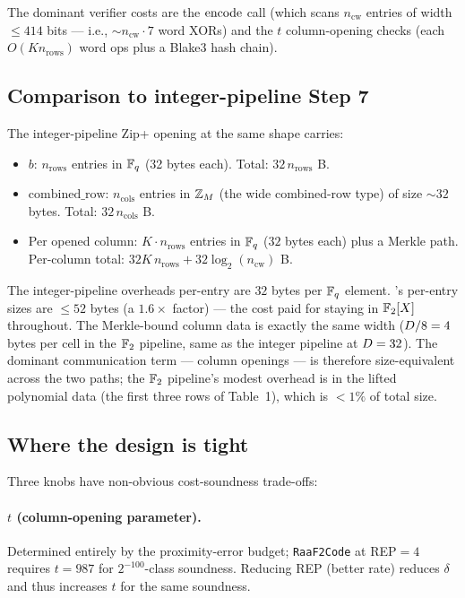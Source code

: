 The dominant verifier costs are the $\operatorname{encode}$ call (which scans
$n_{\mathrm{cw}}$ entries of width $\le 414$ bits — i.e., $\sim
n_{\mathrm{cw}} \cdot 7$ word XORs) and the $t$ column-opening checks
(each $O(K n_{\mathrm{rows}})$ word ops plus a Blake3 hash chain).

\subsection{Comparison to integer-pipeline Step 7}

The integer-pipeline Zip+ opening at the same shape carries:
\begin{itemize}[leftmargin=2em]
  \item $b$: $n_{\mathrm{rows}}$ entries in $\mathbb{F}_q$ (32 bytes each).
    Total: $32 \, n_{\mathrm{rows}}$ B.
  \item $\mathrm{combined\_row}$: $n_{\mathrm{cols}}$ entries in
    $\mathbb{Z}_M$ (the wide combined-row type) of size $\sim 32$ bytes.
    Total: $32 \, n_{\mathrm{cols}}$ B.
  \item Per opened column: $K \cdot n_{\mathrm{rows}}$ entries in
    $\mathbb{F}_q$ ($32$ bytes each) plus a Merkle path. Per-column total:
    $32 K \, n_{\mathrm{rows}} + 32 \log_2(n_{\mathrm{cw}})$ B.
\end{itemize}

The integer-pipeline overheads per-entry are $32$ bytes per $\mathbb{F}_q$
element. 's per-entry sizes are $\le 52$ bytes (a
$1.6\times$ factor) — the cost paid for staying in $\mathbb{F}_2[X]$
throughout. The Merkle-bound column data is exactly the same width
($D/8 = 4$ bytes per cell in the $\mathbb{F}_2$ pipeline, same as the
integer pipeline at $D = 32$). The dominant communication term —
column openings — is therefore size-equivalent across the two paths;
the $\mathbb{F}_2$ pipeline's modest overhead is in the lifted polynomial
data (the first three rows of Table~1), which is $< 1\%$ of total
size.

\subsection{Where the design is tight}

Three knobs have non-obvious cost-soundness trade-offs:

\paragraph{$t$ (column-opening parameter).} Determined entirely by the
proximity-error budget; \texttt{RaaF2Code} at REP$=4$ requires $t =
987$ for $2^{-100}$-class soundness. Reducing REP (better rate)
reduces $\delta$ and thus increases $t$ for the same soundness.

